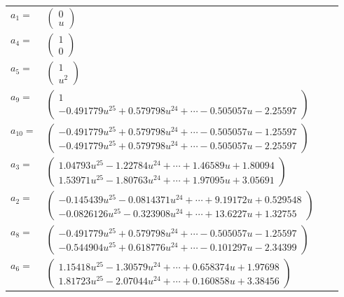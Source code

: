 \documentclass[1p]{elsarticle_modified}
\theoremstyle{definition}
\begin{document}
\begin{tabular}{m{7pt} m{180pt} m{7pt} m{180pt} }
\flushright $a_{1}=$&$\begin{pmatrix}0\\u\end{pmatrix}$ \\
\flushright $a_{4}=$&$\begin{pmatrix}1\\0\end{pmatrix}$ \\
\flushright $a_{5}=$&$\begin{pmatrix}1\\u^2\end{pmatrix}$ \\
\flushright $a_{9}=$&$\begin{pmatrix}1\\-0.491779 u^{25}+0.579798 u^{24}+\cdots-0.505057 u-2.25597\end{pmatrix}$ \\
\flushright $a_{10}=$&$\begin{pmatrix}-0.491779 u^{25}+0.579798 u^{24}+\cdots-0.505057 u-1.25597\\-0.491779 u^{25}+0.579798 u^{24}+\cdots-0.505057 u-2.25597\end{pmatrix}$ \\
\flushright $a_{3}=$&$\begin{pmatrix}1.04793 u^{25}-1.22784 u^{24}+\cdots+1.46589 u+1.80094\\1.53971 u^{25}-1.80763 u^{24}+\cdots+1.97095 u+3.05691\end{pmatrix}$ \\
\flushright $a_{2}=$&$\begin{pmatrix}-0.145439 u^{25}-0.0814371 u^{24}+\cdots+9.19172 u+0.529548\\-0.0826126 u^{25}-0.323908 u^{24}+\cdots+13.6227 u+1.32755\end{pmatrix}$ \\
\flushright $a_{8}=$&$\begin{pmatrix}-0.491779 u^{25}+0.579798 u^{24}+\cdots-0.505057 u-1.25597\\-0.544904 u^{25}+0.618776 u^{24}+\cdots-0.101297 u-2.34399\end{pmatrix}$ \\
\flushright $a_{6}=$&$\begin{pmatrix}1.15418 u^{25}-1.30579 u^{24}+\cdots+0.658374 u+1.97698\\1.81723 u^{25}-2.07044 u^{24}+\cdots+0.160858 u+3.38456\end{pmatrix}$ \\

\end{tabular}
\end{document}
